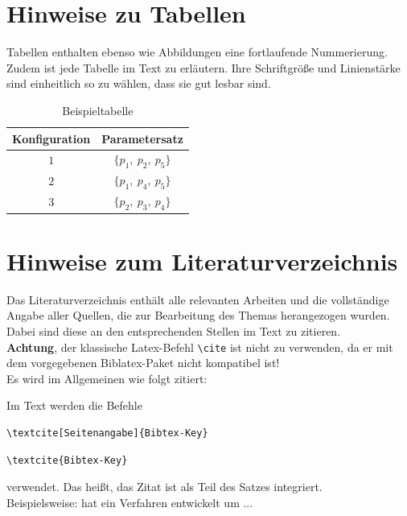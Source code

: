 \section{Hinweise zu Tabellen}
\label{hinweise:tabellen}

Tabellen enthalten ebenso wie Abbildungen eine fortlaufende
Nummerierung. Zudem ist jede Tabelle im Text zu erläutern. Ihre
Schriftgröße und Linienstärke sind einheitlich so zu wählen, 
dass sie gut lesbar sind.

\begin{table}[htbp]
	\caption{Beispieltabelle}
	\renewcommand{\arraystretch}{1.3}
	\centering
	\begin{tabular}{cc}
		\toprule
		Konfiguration & Parametersatz \\
		\midrule
		$1$ & $\{p_{1}, \: p_{2}, \: p_{5}\}$ \\
		$2$ & $\{p_{1}, \: p_{4}, \: p_{5}\}$ \\
		$3$ & $\{p_{2}, \: p_{3}, \: p_{4}\}$ \\
		\bottomrule
	\end{tabular}
	\label{tab:bsp1}
\end{table}


\section{Hinweise zum Literaturverzeichnis}
\label{hinweise:literaturverzeichnis}

Das Literaturverzeichnis enthält alle relevanten Arbeiten und  die vollständige Angabe aller
Quellen, die zur Bearbeitung des Themas herangezogen wurden. Dabei
sind diese an den entsprechenden Stellen im Text zu zitieren. \\

\textbf{Achtung}, der klassische Latex-Befehl \texttt{\textbackslash cite} ist nicht zu verwenden, da er mit dem vorgegebenen Biblatex-Paket nicht kompatibel ist! \\

Es wird im Allgemeinen wie folgt zitiert:

Im Text werden die Befehle 
\begin{verbatim}\textcite[Seitenangabe]{Bibtex-Key}\end{verbatim}
\begin{verbatim}\textcite{Bibtex-Key}\end{verbatim}
verwendet. Das heißt, das Zitat ist als Teil des Satzes integriert.\\
Beispielsweise: \textcite[S. 123 ff.]{Book3} hat ein Verfahren entwickelt um ... 

